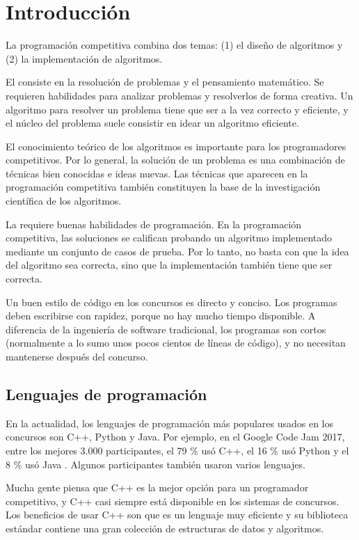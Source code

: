 \chapter{Introducción}

La programación competitiva combina dos temas:
(1) el diseño de algoritmos y (2) la implementación de algoritmos.

El  consiste en la resolución de problemas
y el pensamiento matemático.
Se requieren habilidades para analizar problemas y resolverlos
de forma creativa.
Un algoritmo para resolver un problema
tiene que ser a la vez correcto y eficiente,
y el núcleo del problema suele consistir
en idear un algoritmo eficiente.

El conocimiento teórico de los algoritmos
es importante para los programadores competitivos.
Por lo general, la solución de un problema es
una combinación de técnicas bien conocidas e
ideas nuevas.
Las técnicas que aparecen en la programación competitiva
también constituyen la base de la investigación
científica de los algoritmos.

La  requiere buenas
habilidades de programación.
En la programación competitiva, las soluciones
se califican probando un algoritmo implementado
mediante un conjunto de casos de prueba.
Por lo tanto, no basta con que la idea del
algoritmo sea correcta, sino que la implementación también
tiene que ser correcta.

Un buen estilo de código en los concursos es
directo y conciso.
Los programas deben escribirse con rapidez,
porque no hay mucho tiempo disponible.
A diferencia de la ingeniería de software tradicional,
los programas son cortos (normalmente a lo sumo unos pocos
cientos de líneas de código), y no necesitan
mantenerse después del concurso.

\section{Lenguajes de programación}


En la actualidad, los lenguajes de programación
más populares usados en los concursos son C++, Python y Java.
Por ejemplo, en el Google Code Jam 2017,
entre los mejores 3.000 participantes,
el 79 \% usó C++,
el 16 \% usó Python y
el 8 \% usó Java \cite{goo17}.
Algunos participantes también usaron varios lenguajes.

Mucha gente piensa que C++ es la mejor opción
para un programador competitivo,
y C++ casi siempre está disponible en
los sistemas de concursos.
Los beneficios de usar C++ son que
es un lenguaje muy eficiente y
su biblioteca estándar contiene una
gran colección
de estructuras de datos y algoritmos.

